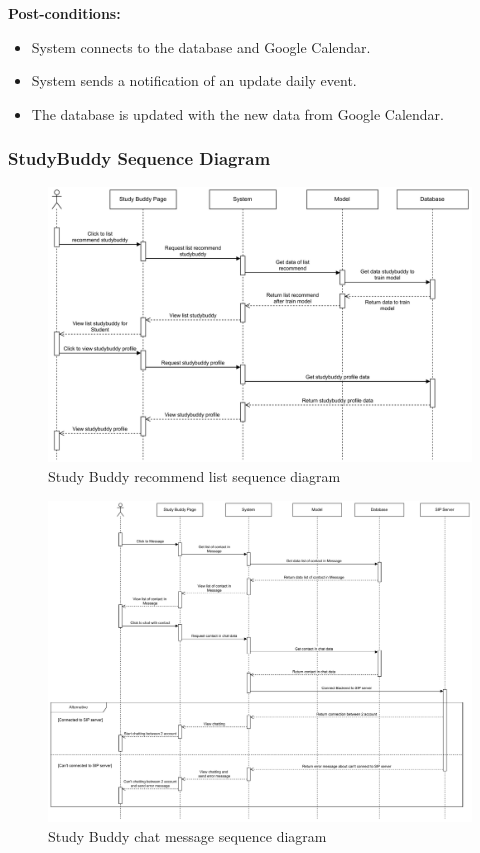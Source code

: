     \noindent \textbf{Post-conditions:}
    \begin{itemize}
        \item System connects to the database and Google Calendar.
        \item System sends a notification of an update daily event.
        \item The database is updated with the new data from Google Calendar.
    \end{itemize}

\subsubsection{StudyBuddy Sequence Diagram}
    \begin{figure}[H]
        \centering
        \includegraphics[width=1\textwidth]{image/StudyBuddySequenceDiagram-SB.pdf} 
        \caption{Study Buddy recommend list sequence diagram}
        \label{fig:studyBuddy_recommendlist_sequence}
    \end{figure}

    \begin{figure}[H]
        \centering
        \includegraphics[width=1\textwidth, height=0.5\textheight]{image/StudyBuddySequenceDiagram-Message.pdf} 
        \caption{Study Buddy chat message sequence diagram}
        \label{fig:studyBuddy_chatmessage_sequence}
    \end{figure}

